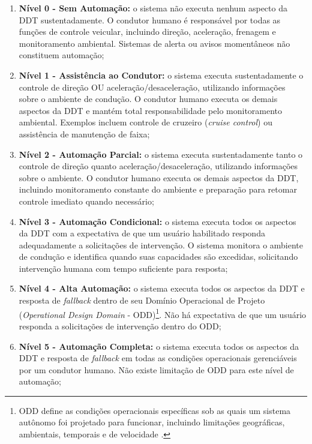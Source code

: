 \begin{enumerate}
\item \textbf{Nível 0 - Sem Automação:} o sistema não executa nenhum aspecto da DDT sustentadamente. O condutor humano é responsável por todas as funções de controle veicular, incluindo direção, aceleração, frenagem e monitoramento ambiental. Sistemas de alerta ou avisos momentâneos não constituem automação;

\item \textbf{Nível 1 - Assistência ao Condutor:} o sistema executa sustentadamente o controle de direção OU aceleração/desaceleração, utilizando informações sobre o ambiente de condução. O condutor humano executa os demais aspectos da DDT e mantém total responsabilidade pelo monitoramento ambiental. Exemplos incluem controle de cruzeiro (\textit{cruise control}) ou assistência de manutenção de faixa;

\item \textbf{Nível 2 - Automação Parcial:} o sistema executa sustentadamente tanto o controle de direção quanto aceleração/desaceleração, utilizando informações sobre o ambiente. O condutor humano executa os demais aspectos da DDT, incluindo monitoramento constante do ambiente e preparação para retomar controle imediato quando necessário;

\item \textbf{Nível 3 - Automação Condicional:} o sistema executa todos os aspectos da DDT com a expectativa de que um usuário habilitado responda adequadamente a solicitações de intervenção. O sistema monitora o ambiente de condução e identifica quando suas capacidades são excedidas, solicitando intervenção humana com tempo suficiente para resposta;

\item \textbf{Nível 4 - Alta Automação:} o sistema executa todos os aspectos da DDT e resposta de \textit{fallback} dentro de seu Domínio Operacional de Projeto (\textit{Operational Design Domain} - ODD)\footnote{ODD define as condições operacionais específicas sob as quais um sistema autônomo foi projetado para funcionar, incluindo limitações geográficas, ambientais, temporais e de velocidade \cite[p.~33]{SAE}.}. Não há expectativa de que um usuário responda a solicitações de intervenção dentro do ODD;

\item \textbf{Nível 5 - Automação Completa:} o sistema executa todos os aspectos da DDT e resposta de \textit{fallback} em todas as condições operacionais gerenciáveis por um condutor humano. Não existe limitação de ODD para este nível de automação;
\end{enumerate}

